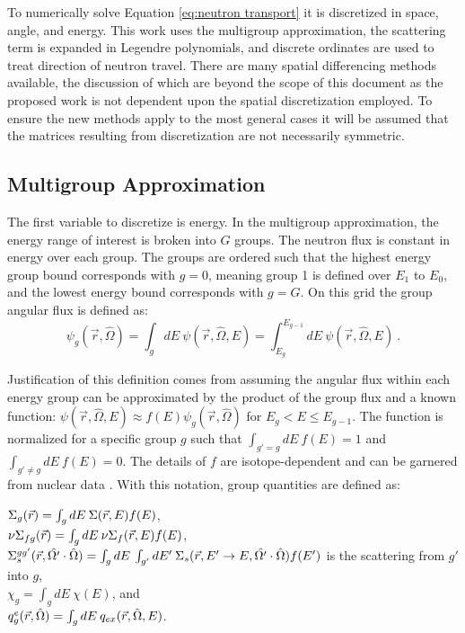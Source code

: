 To numerically solve Equation \eqref{eq:neutron transport} it is discretized in space, angle, and energy. This work uses the multigroup approximation, the scattering term is expanded in Legendre polynomials, and discrete ordinates are used to treat direction of neutron travel. There are many spatial differencing methods available, the discussion of which are beyond the scope of this document as the proposed work is not dependent upon the spatial discretization employed. To ensure the new methods apply to the most general cases it will be assumed that the matrices resulting from discretization are not necessarily symmetric. 

\subsection{Multigroup Approximation}
The first variable to discretize is energy. In the multigroup approximation, the energy range of interest is broken into $G$ groups. The neutron flux is constant in energy over each group. The groups are ordered such that the highest energy group bound corresponds with $g = 0$, meaning group 1 is defined over $E_{1}$ to $E_{0}$, and the lowest energy bound corresponds with $g = G$. On this grid the group angular flux is defined as: 
%
\begin{equation}
  \psi_{g}(\vec{r},\hat{\Omega}) = \int_{g} dE \:\psi(\vec{r}, \hat{\Omega}, E) = \int_{E_{g}}^{E_{g-1}}dE \:\psi(\vec{r}, \hat{\Omega}, E) \:.
\end{equation}

Justification of this definition comes from assuming the angular flux within each energy group can be approximated by the product of the group flux and a known function: $\psi(\vec{r}, \hat{\Omega}, E) \approx f(E)  \psi_{g}(\vec{r},\hat{\Omega})$ for $E_{g} < E \le E_{g-1}$. The function is normalized for a specific group $g$ such that $\int_{g' = g} dE \:f(E) = 1$ and $\int_{g' \ne g} dE \:f(E) = 0$. The details of $f$ are isotope-dependent and can be garnered from nuclear data \cite{Lewis1993}. With this notation, group quantities are defined as:

\indent $\Sigma_{g}(\vec{r}) = \int_{g} dE \:\Sigma(\vec{r}, E) f(E)$, \\
\indent $\nu \Sigma_{fg}(\vec{r}) = \int_{g} dE \:\nu \Sigma_{f}(\vec{r}, E) f(E)$, \\ 
\indent $\Sigma_s^{gg'}(\vec{r}, \hat{\Omega'} \cdot \hat{\Omega}) = \int_{g} dE \:\int_{g'} dE' \:\Sigma_{s}(\vec{r}, E' \to E, \hat{\Omega'} \cdot \hat{\Omega})  f(E')$ is the scattering from $g'$ into $g$, \\
\indent $\chi_{g} = \int_{g} dE \:\chi(E)$, and \\
\indent $q^{e}_{g}(\vec{r}, \hat{\Omega}) = \int_{g} dE \:q_{ex}(\vec{r}, \hat{\Omega}, E)$.

